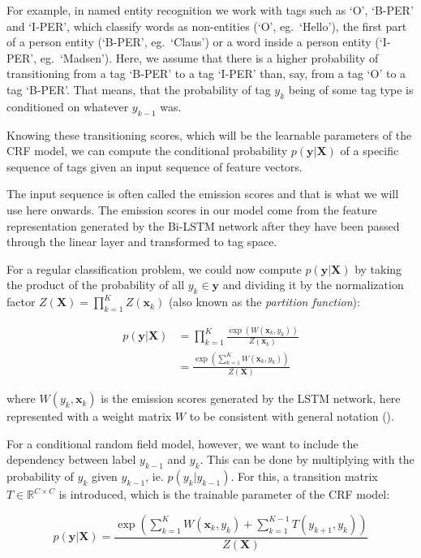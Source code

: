 For example, in named entity recognition we work with tags such as `O', `B-PER'
and `I-PER', which classify words as non-entities (`O', eg.\ `Hello'), the first
part of a person entity (`B-PER', eg.\ `Claus') or a word inside a person entity
(`I-PER', eg.\ `Madsen'). Here, we assume that there is a higher probability of
transitioning from a tag `B-PER' to a tag `I-PER' than, say, from a tag `O' to a
tag `B-PER'.  That means, that the probability of tag $y_{k}$ being of some tag
type is conditioned on whatever $y_{k-1}$ was.

Knowing these transitioning scores, which will be the learnable parameters of
the CRF model, we can compute the conditional probability $p(\bm{y}|\bm{X})$ of
a specific sequence of tags given an input sequence of feature vectors.

The input sequence is often called the emission scores and that is what we will
use here onwards. The emission scores in our model come from the feature
representation generated by the Bi-LSTM network after they have been passed
through the linear layer and transformed to tag space. 

For a regular classification problem, we could now compute $p(\bm{y}|\bm{X})$ by
taking the product of the probability of all $y_{k} \in \bm{y}$ and dividing it
by the normalization factor $Z(\bm{X}) = \prod_{k=1}^{K} Z(\bm{x}_{k})$ (also
known as the \textit{partition function}):

\begin{align*}
p(\bm{y}|\bm{X}) & = \prod_{k=1}^{K} \frac{\exp( W(\bm{x}_{k}, y_{k}) )} 
                                            {Z(\bm{x}_{k})} \\
                 & = \frac{\exp( \sum_{k=1}^{K} W(\bm{x}_k, y_{k}) )}
                                            {Z(\bm{X})}
\end{align*}

where $W(y_{k}, \bm{x}_{k})$ is the emission scores generated by the LSTM
network, here represented with a weight matrix $W$ to be consistent with general
notation (\cite{treviso2019crf}).

For a conditional random field model, however, we want to include the
dependency between label $y_{k-1}$ and $y_{k}$. This can be done by multiplying
with the probability of $y_{k}$ given $y_{k-1}$, ie. $p(y_{k}|y_{k-1})$. For
this, a transition matrix $T \in \mathbb{R}^{C \times C}$ is introduced, which 
is the trainable parameter of the CRF model:

\begin{equation*}
p(\bm{y}|\bm{X}) = \frac{\exp( \sum_{k=1}^{K} W(\bm{x}_k, y_{k}) +
                    \sum_{k=1}^{K-1} T(y_{k+1}, y_{k}) )}{Z(\bm{X})}
\end{equation*}

